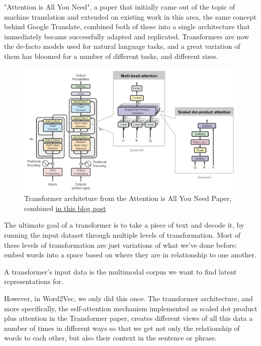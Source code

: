 \documentclass[11pt, table]{diazessay} %
\begin{document}
\begin{sloppypar}
"Attention is All You Need", a paper that initially came out of the topic of machine translation and extended on existing work in this area, the same concept behind Google Translate\citep{vaswani2017attention}, combined both of these into a single architecture that immediately became successfully adapted and replicated. Transformers are now the de-facto models used for natural language tasks, and a great variation of them has bloomed for a number of different tasks, and different sizes. 

\begin{figure}[H]
\centering
\includegraphics[width=.9\textwidth]{figures/transformer.png}
\caption{Transformer architeture from the Attention is All You Need Paper, combined  \href{https://lilianweng.github.io/posts/2018-06-24-attention/}{in this blog post }}
\end{figure}

The ultimate goal of a transformer is to take a piece of text and decode it, by running the input dataset through multiple levels of transformation. Most of these levels of transformation are just variations of what we've done before: embed words into a space based on where they are in relationship to one another. 

A transformer's input data is the multimodal corpus we want to find latent representations for. 

However, in Word2Vec, we only did this once. The transformer architecture, and more specifically, the self-attention mechanism implemented as scaled dot product plus attention in the Transformer paper, creates different views of all this data a number of times in different ways so that we get not only the relationship of words to each other, but also their context in the sentence or phrase.


\end{sloppypar}
\end{document}
